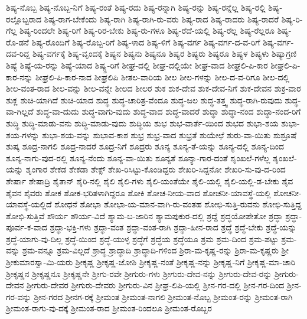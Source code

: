 {ಶಿಷ್ಯ-ನೊಬ್ಬ
ಶಿಷ್ಯ-ನೊಬ್ಬ-ನಿಗೆ
ಶಿಷ್ಯ-ರಂತೆ
ಶಿಷ್ಯ-ರದು
ಶಿಷ್ಯ-ರನ್ನಾಗಿ
ಶಿಷ್ಯ-ರನ್ನು
ಶಿಷ್ಯ-ರನ್ನೆಲ್ಲ
ಶಿಷ್ಯ-ರಲ್ಲಿ
ಶಿಷ್ಯ-ರಲ್ಲೊಬ್ಬರಾದ
ಶಿಷ್ಯ-ರಾಗ-ಬೇಕೆಂದು
ಶಿಷ್ಯ-ರಾಗಿ
ಶಿಷ್ಯ-ರಾಗಿ-ರು-ವರು
ಶಿಷ್ಯ-ರಾದ
ಶಿಷ್ಯ-ರಾದರು
ಶಿಷ್ಯ-ರಾದರೆ
ಶಿಷ್ಯ-ರಿ-ಗೆಲ್ಲ
ಶಿಷ್ಯ-ರಿಂದಲೇ
ಶಿಷ್ಯ-ರಿಗೆ
ಶಿಷ್ಯ-ರಿರ-ಬೇಕು
ಶಿಷ್ಯ-ರು-ಗಳೂ
ಶಿಷ್ಯ-ರೆದೆ-ಯಲ್ಲಿ
ಶಿಷ್ಯ-ರೆಲ್ಲ
ಶಿಷ್ಯ-ರೆಲ್ಲರೂ
ಶಿಷ್ಯ-ರೊ-ಡನೆ
ಶಿಷ್ಯ-ರೊಂದಿಗೆ
ಶಿಷ್ಯ-ರೊಬ್ಬ-ರಿಗೆ
ಶಿಷ್ಯ-ಳಾದ
ಶಿಷ್ಯ-ಳಿಗೆ
ಶಿಷ್ಯ-ವರ್ಗ
ಶಿಷ್ಯ-ವರ್ಗ-ದ-ವ-ರಿಗೆ
ಶಿಷ್ಯ-ವರ್ಗ-ದವ-ರಿದ್ದ
ಶಿಷ್ಯ-ವರ್ಗಕ್ಕೆ
ಶಿಷ್ಯ-ವೃಂದಕ್ಕೆ
ಶಿಷ್ಯನ
ಶಿಷ್ಯನು
ಶಿಷ್ಯನೂ
ಶಿಷ್ಯರ
ಶಿಷ್ಯರು
ಶಿಷ್ಯರೂ
ಶಿಷ್ಯಳ
ಶಿಷ್ಯಳು
ಶಿಷ್ಯಾಗ್ರಣಿ
ಶಿಷ್ಯೆ
ಶಿಷ್ಯೆ-ಯ-ರನ್ನು
ಶಿಷ್ಯೆ-ಯಾದ
ಶಿಷ್ಯ್ತ-ರಿಗೆ
ಶೀಘ್ರ-ದಲ್ಲಿ
ಶೀಘ್ರ-ದಲ್ಲಿಯೇ
ಶೀಘ್ರ-ವಾದ
ಶೀಘ್ರಲಿ-ಪಿ-ಕಾರ
ಶೀಘ್ರಲಿ-ಪಿ-ಕಾರ-ನನ್ನು
ಶೀಘ್ರಲಿ-ಪಿ-ಕಾರ-ನಾದ
ಶೀಘ್ರಲಿಪಿ
ಶೀತಲ-ವಾರಿಯ
ಶೀಲ
ಶೀಲ-ಗಳನ್ನು
ಶೀಲ-ದ-ವ-ರಿಗೂ
ಶೀಲ-ದಲ್ಲಿ
ಶೀಲ-ವಂತ-ರಾದ
ಶೀಲ-ವನ್ನು
ಶೀಲ-ವನ್ನೇ
ಶೀಲದ
ಶೀಲರ
ಶುಕ
ಶುಕ-ದೇವ
ಶುಕ-ದೇವ-ನಿಗೆ
ಶುಕ-ದೇವನ
ಶುಕ್ರ-ವಾರ
ಶುಕ್ಲ
ಶುಚಿ-ಯಾಗಿದೆ
ಶುಚಿ-ಯಾದ
ಶುದ್ಧ
ಶುದ್ಧ-ಚಾರಿತ್ರ-ವೆಂದೂ
ಶುದ್ಧ-ಜಲ
ಶುದ್ಧ-ತತ್ತ್ವ
ಶುದ್ಧ-ರಾಗಿ-ರುವುದು
ಶುದ್ಧ-ವಾ-ಗಿಲ್ಲದೆ
ಶುದ್ಧ-ವಾ-ದುದು
ಶುದ್ಧ-ವಾಗು-ವುದು
ಶುದ್ಧ-ವಾದ
ಶುದ್ಧ-ವಾದರೆ
ಶುದ್ಧಾ
ಶುದ್ಧಾ-ನಂದ
ಶುದ್ಧಾ-ನಂದ-ರಿಗೆ
ಶುದ್ಧಿ
ಶುದ್ಧಿ-ಮಾಡು-ವನು
ಶುದ್ಧಿ-ಮಾಡು-ವುದು
ಶುದ್ಧಿಯ
ಶುಭ
ಶುಭ-ವಾರ್ತೆ-ಯಿಂದ
ಶುಭದ
ಶುಭಾ-ಶಯ
ಶುಭಾ-ಶಯ-ಗಳನ್ನು
ಶುಭಾ-ಶಯ-ವನ್ನು
ಶುಭಾವ-ಕಾಶ
ಶುಭ್ರ
ಶುಭ್ರ-ವಾದ
ಶುಭ್ರತೆ
ಶುಯೇಛೆ
ಶುರು-ವಾ-ಯಿತು
ಶುಶ್ರೂಷೆ
ಶುಷ್ಕ
ಶೂದ್ರ-ನಾಗಲಿ
ಶೂದ್ರ-ನಾದರೆ
ಶೂದ್ರ-ನಿಗೆ
ಶೂದ್ರರು
ಶೂನ್ಯ
ಶೂನ್ಯ-ತೆ-ಯನ್ನು
ಶೂನ್ಯ-ದಲ್ಲಿ
ಶೂನ್ಯ-ದಿಂದ
ಶೂನ್ಯ-ನಾಗು-ವುದ-ರಲ್ಲಿ
ಶೂನ್ಯ-ನೆಂದು
ಶೂನ್ಯ-ವಾ-ಯಿತು
ಶೂನ್ಯತೆ
ಶೂನ್ಯಾ-ಗಾರ-ದಂತೆ
ಶೃಂಖಲೆ-ಗಳೆಲ್ಲ
ಶೃಂಖಲೆ-ಯನ್ನು
ಶೃಂಗಾರ
ಶೇಕಡ
ಶೇಕಡಾ
ಶೇಕ್ಸ್
ಶೇಖ-ರಿಸಿಟ್ಟು-ಕೊಂಡಿದ್ದರು
ಶೇಖರಿ-ಸಿದ್ದನೋ
ಶೇಖರಿ-ಸು-ವು-ದ-ರಿಂದ
ಶೇರ್ಷಾ
ಶೇಷಾದ್ರಿ
ಶೈತಾನ್
ಶೈರಿ-ನಲ್ಲಿ
ಶೈಲಿ
ಶೈಲಿ-ಗಳು
ಶೈಲಿ-ಯಂತೆಯೇ
ಶೈಲಿ-ಯಲ್ಲಿ
ಶೈಲಿ-ಯಲ್ಲಿ-ಡ-ಬೇಕು
ಶೈವ
ಶೈವನ
ಶೈವರು
ಶೋಕ
ಶೋಕ-ಭರಿತಳಾಗಿದ್ದರೂ
ಶೋಕಿ
ಶೋಚ-ನೀಯ-ವಾದ
ಶೋಚನೀ-ಯಾವಸ್ಥೆ-ಯಲ್ಲಿ
ಶೋಚನೀ-ಯಾವಸ್ಥೆ-ಯಲ್ಲಿದೆ
ಶೋಧನೆ
ಶೋಭಾ
ಶೋಭಾ-ಯ-ಮಾನ-ವಾಗಿ-ರು-ವಂತಹ
ಶೋಭಿ-ಸುತ್ತಿ-ರುವನು
ಶೋಭಿ-ಸುತ್ತಿದ್ದ
ಶೋಭಿ-ಸುತ್ತಿವೆ
ಶೌರ್ಯ
ಶೌರ್ಯ-ವಿದೆ
ಶ್ಯಾಮ-ಬ-ಜಾರಿನ
ಶ್ಯಾಮಪುಕುರ-ದಲ್ಲಿ
ಶ್ರದ್ದೆ
ಶ್ರದ್ಧಯೋಪೇತೋ
ಶ್ರದ್ಧಾ
ಶ್ರದ್ಧಾ-ಪೂರ್ವ-ಕ-ವಾದ
ಶ್ರದ್ಧಾ-ಭಕ್ತಿ-ಗಳು
ಶ್ರದ್ಧಾ-ವಂತ
ಶ್ರದ್ಧಾ-ವಂತ-ರಾಗಿ
ಶ್ರದ್ಧಾ-ಹೀನ-ರಾದ
ಶ್ರದ್ಧೆ
ಶ್ರದ್ಧೆ-ಬೇಕು
ಶ್ರದ್ಧೆ-ಯನ್ನು
ಶ್ರದ್ಧೆ-ಯಾಗು-ವು-ದಿಲ್ಲ
ಶ್ರದ್ಧೆ-ಯಿಂದ
ಶ್ರದ್ಧೆ-ಯುಳ್ಳ
ಶ್ರದ್ಧೆಗೆ
ಶ್ರದ್ಧೆಯ
ಶ್ರದ್ಧೆಯೂ
ಶ್ರಮ
ಶ್ರಮ-ದಿಂದ
ಶ್ರಮ-ಪಟ್ಟು
ಶ್ರಮ-ವನ್ನು
ಶ್ರಮ-ವನ್ನೂ
ಶ್ರಮ-ವಿಲ್ಲದೆ
ಶ್ರಾದ್ಧ
ಶ್ರಾದ್ಧಾದಿ
ಶ್ರಾದ್ಧಾದಿ-ಗಳಿಂದ
ಶ್ರಿರಾ-ಮ-ಕೃಷ್ಣ-ರನ್ನು
ಶ್ರಿರಾ-ಮ-ಕೃಷ್ಣರು
ಶ್ರೀ
ಶ್ರೀಕುಮಾರಸ್ವಾ-ಮಿ-ಯರು
ಶ್ರೀಕೃಷ್ಣ
ಶ್ರೀಕೃಷ್ಣ-ಜೋಶಿ
ಶ್ರೀಕೃಷ್ಣ-ನಂತೆ
ಶ್ರೀಕೃಷ್ಣ-ನನ್ನು
ಶ್ರೀಕೃಷ್ಣ-ನಿಗೆ
ಶ್ರೀಕೃಷ್ಣ-ಮಾ-ಚಾರಿ
ಶ್ರೀಕೃಷ್ಣನ
ಶ್ರೀಕೃಷ್ಣನೂ
ಶ್ರೀಕೃಷ್ಣನೇ
ಶ್ರೀಗು-ರವೇ
ಶ್ರೀಗುರು-ಗಳು
ಶ್ರೀಗುರು-ದೇವ-ನನ್ನು
ಶ್ರೀಗುರು-ದೇವ-ರನ್ನು
ಶ್ರೀಗುರು-ದೇವನ
ಶ್ರೀಗುರು-ದೇವರ
ಶ್ರೀಗುರು-ದೇವರು
ಶ್ರೀಗುರು-ವಿನ
ಶ್ರೀಘ್ರ-ಲಿಪಿ-ಯಲ್ಲಿ
ಶ್ರೀನ-ಗರ-ದಲ್ಲಿ
ಶ್ರೀನ-ಗರ-ದಿಂದ
ಶ್ರೀನ-ಗರ-ವನ್ನು
ಶ್ರೀನ-ಗರದ
ಶ್ರೀನಗ-ರಕ್ಕೆ
ಶ್ರೀಮಂತ
ಶ್ರೀಮಂತ-ನಾಗಲಿ
ಶ್ರೀಮಂತ-ನೊಬ್ಬ
ಶ್ರೀಮಂತ-ರನ್ನು
ಶ್ರೀಮಂತ-ರಾಗಿ
ಶ್ರೀಮಂತ-ರಾಗು-ವು-ದಕ್ಕೆ
ಶ್ರೀಮಂತ-ರಾದ
ಶ್ರೀಮಂತ-ರಿಂದಲೂ
ಶ್ರೀಮಂತ-ರೊಬ್ಬರ
}
